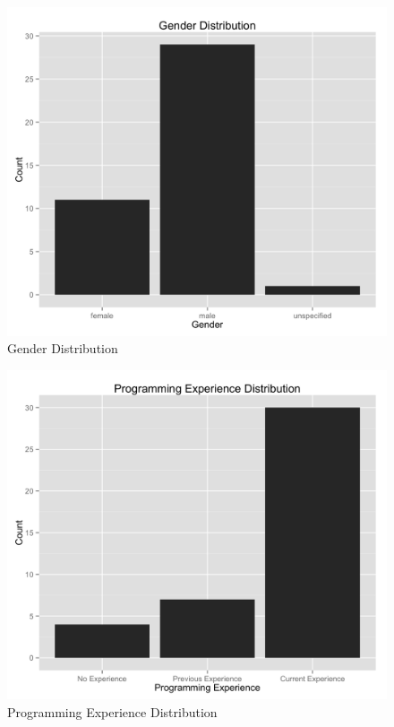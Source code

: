 \begin{figure}
    \centering
    \includegraphics[width=1.0\linewidth]{../study-2/results/graphs/gender.png}
    \caption{Gender Distribution}
    \label{genderdistribution}
\end{figure}



\begin{figure}
    \centering
    \includegraphics[width=1.0\linewidth]{../study-2/results/graphs/programming.png}
    \caption{Programming Experience Distribution}
    \label{programmingdistribution}
\end{figure}


